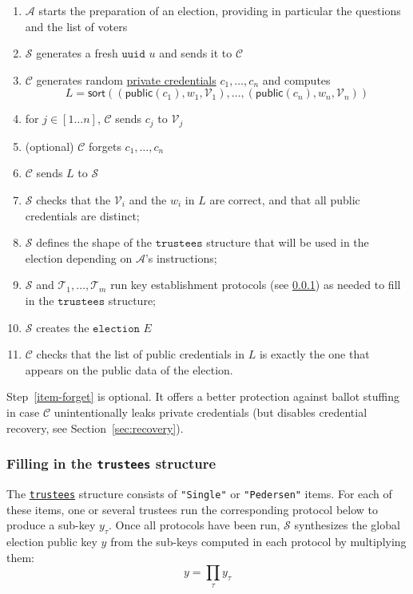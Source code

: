 \documentclass[a4paper]{article}
\newcommand{\public}{\textsf{public}}
\newcommand{\uuid}{\texttt{uuid}}
\newcommand{\election}{\texttt{election}}
\begin{document}
\begin{enumerate}
\item $\mathcal{A}$ starts the preparation of an election, providing
  in particular the questions and the list of voters
\item $\mathcal{S}$ generates a fresh \hyperref[basic-types]{$\uuid$} $u$ and
  sends it to $\mathcal{C}$
\item $\mathcal{C}$ generates random \hyperref[credentials]{private
    credentials} $c_1,\dots,c_n$ and computes
  \[L=\textsf{sort}((\public(c_1),w_1,\mathcal{V}_1),\dots,(\public(c_n),w_n,\mathcal{V}_n))\]
\item for $j\in[1\dots n]$, $\mathcal{C}$ sends $c_j$ to $\mathcal{V}_j$
\item \label{item-forget} (optional) $\mathcal{C}$ forgets $c_1,\dots,c_n$
 \item $\mathcal{C}$ sends $L$ to $\mathcal{S}$
 \item $\mathcal{S}$ checks that the $\mathcal{V}_i$ and the $w_i$ in
   $L$ are correct, and that all public credentials are
   distinct;
 \item $\mathcal{S}$ defines the shape of the
   \hyperref[trustees]{$\texttt{trustees}$} structure that will be
   used in the election depending on $\mathcal{A}$'s instructions;
 \item $\mathcal{S}$ and $\mathcal{T}_1,\dotsc,\mathcal{T}_m$ run key
   establishment protocols (see \ref{process-filling-trustees}) as
     needed to fill in the $\texttt{trustees}$ structure;
\item $\mathcal{S}$ creates the \hyperref[elections]{$\election$} $E$
\item $\mathcal{C}$ checks that the list of public credentials in $L$
  is exactly the one that appears on the public data of the election.
\end{enumerate}
Step~\ref{item-forget} is optional. It offers a better protection
against ballot stuffing in case $\mathcal{C}$ unintentionally leaks
private credentials (but disables credential recovery, see
Section~\ref{sec:recovery}).

\subsubsection{Filling in the \texttt{trustees} structure}
\label{process-filling-trustees}

The \hyperref[trustees]{\texttt{trustees}} structure consists of
\texttt{"Single"} or \texttt{"Pedersen"} items. For each of these
items, one or several trustees run the corresponding protocol below to
produce a sub-key $y_\tau$. Once all protocols have been run,
$\mathcal{S}$ synthesizes the global election public key $y$ from the
sub-keys computed in each protocol by multiplying them:
\[
  y=\prod_\tau y_\tau
\]
\end{document}
